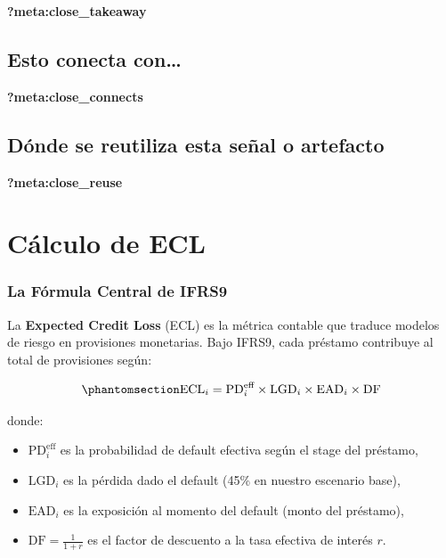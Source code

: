 \documentclass[
  spanish,
  11pt,
  letterpaper,
]{scrbook}
\providecommand{\tightlist}{%
  \setlength{\itemsep}{0pt}\setlength{\parskip}{0pt}}
\theoremstyle{plain}
\theoremstyle{remark}
\begin{document}
\begin{tcolorbox}[enhanced jigsaw, arc=.35mm, bottomrule=.15mm, bottomtitle=1mm, breakable, colback=white, colbacktitle=quarto-callout-tip-color!10!white, colframe=quarto-callout-tip-color-frame, coltitle=black, left=2mm, leftrule=.75mm, opacityback=0, opacitybacktitle=0.6, rightrule=.15mm, title=\textcolor{quarto-callout-tip-color}{\faLightbulb}\hspace{0.5em}{Qué debes quedarte}, titlerule=0mm, toprule=.15mm, toptitle=1mm]

\textbf{?meta:close\_takeaway}

\section{Esto conecta con\ldots{}}\label{esto-conecta-con-8}

\textbf{?meta:close\_connects}

\section{Dónde se reutiliza esta señal o
artefacto}\label{duxf3nde-se-reutiliza-esta-seuxf1al-o-artefacto-8}

\textbf{?meta:close\_reuse}

\end{tcolorbox}

\chapter{Cálculo de ECL}\label{sec-ecl-calculation}

\subsection{La Fórmula Central de
IFRS9}\label{la-fuxf3rmula-central-de-ifrs9}

La \textbf{Expected Credit Loss} (ECL) es la métrica contable que
traduce modelos de riesgo en provisiones monetarias. Bajo IFRS9, cada
préstamo contribuye al total de provisiones según:

\begin{equation}\protect\phantomsection\label{eq-ecl-formula}{
\text{ECL}_i = \text{PD}_i^{\text{eff}} \times \text{LGD}_i \times \text{EAD}_i \times \text{DF}
}\end{equation}

donde:

\begin{itemize}
\tightlist
\item
  \(\text{PD}_i^{\text{eff}}\) es la probabilidad de default efectiva
  según el stage del préstamo,
\item
  \(\text{LGD}_i\) es la pérdida dado el default (45\% en nuestro
  escenario base),
\item
  \(\text{EAD}_i\) es la exposición al momento del default (monto del
  préstamo),
\item
  \(\text{DF} = \frac{1}{1 + r}\) es el factor de descuento a la tasa
  efectiva de interés \(r\).
\end{itemize}
\end{document}
